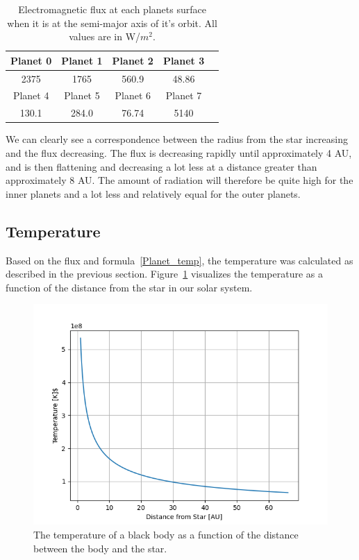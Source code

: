 \documentclass[reprint,english,notitlepage]{revtex4-2}
\begin{document}
	\begin{table}[h]
	    \begin{tabular}{|c|c|c|c|c|}
	        \hline
			Planet 0 & Planet 1 & Planet 2 & Planet 3\\
	        \hline
			2375 & 1765 & 560.9 & 48.86\\
			\hline\hline
			Planet 4 & Planet 5 & Planet 6 & Planet 7\\
	        \hline
			130.1 & 284.0 & 76.74 & 5140\\
			\hline
	    \end{tabular}
	    \caption{Electromagnetic flux at each planets surface when it is at the semi-major axis of it's orbit. All values are in W/$m^2$.}
	    \label{tab:planet_flux}
	\end{table}

	We can clearly see a correspondence between the radius from the star increasing and the flux decreasing.
	The flux is decreasing rapidly until approximately 4 AU, and is then flattening and decreasing a lot less at a distance greater than approximately 8 AU.
	The amount of radiation will therefore be quite high for the inner planets and a lot less and relatively equal for the outer planets.




\subsection{Temperature}\label{subsec:temperature-results}
	Based on the flux and formula~\eqref{Planet_temp}, the temperature was calculated as described in the previous section.
	Figure~\ref{fig:Radius_Temp} visualizes the temperature as a function of the distance from the star in our solar system.

	\begin{figure}[h]
		\centering
		\includegraphics[scale=0.4]{Figures/Radius_temp}
		\caption{The temperature of a black body as a function of the distance between the body and the star.}\label{fig:Radius_Temp}
	\end{figure}
\end{document}
